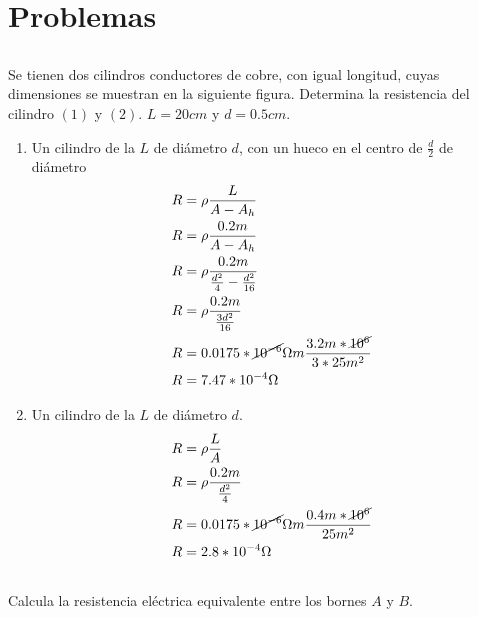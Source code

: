 \documentclass[../main.tex]{subfiles}
\begin{document}
\section{Problemas}%
\label{sec:problemas}


\thispagestyle{fancy}

\setcounter{subsection}{4}
\subsection{}%
Se tienen dos cilindros conductores de cobre, con igual longitud, cuyas
dimensiones se muestran en la siguiente figura.
Determina la resistencia del cilindro $(1)$ y $(2)$.
$L=20cm$ y $d=0.5cm$.

\begin{enumerate}[1)]
	\item Un cilindro de la $L$ de diámetro $d$, con un hueco en el centro
		de $\frac{d}{2}$ de diámetro
		\begin{align*}
			R &= \rho \frac{L}{A-A_h}\\
			R &= \rho \frac{0.2m}{A-A_h}\\
			R &= \rho \frac{0.2m}{ \frac{d^2}{4} - \frac{d^2}{16} }\\
			R &= \rho \frac{0.2m}{ \frac{3d^2}{16} }\\
			R &= 0.0175 *\cancel{10^{-6}}\Omega m \frac{3.2m*\cancel{10^6}}{3*25m^2}\\
			R &= 7.47 *10^{-4}\Omega
		\end{align*}
	\item Un cilindro de la $L$ de diámetro $d$.
		\begin{align*}
			R &= \rho \frac{L}{A}\\
			R &= \rho \frac{0.2m}{ \frac{d^2}{4}}\\
			R &= 0.0175 *\cancel{10^{-6}}\Omega m \frac{0.4m*\cancel{10^6}}{25m^2}\\
			R &= 2.8 *10^{-4}\Omega
		\end{align*}
\end{enumerate}

\setcounter{subsection}{6}
\subsection{}%

Calcula la resistencia eléctrica equivalente entre los bornes $A$ y $B$.
\begin{figure}[H]
	\centering
\end{figure}
\end{document}
